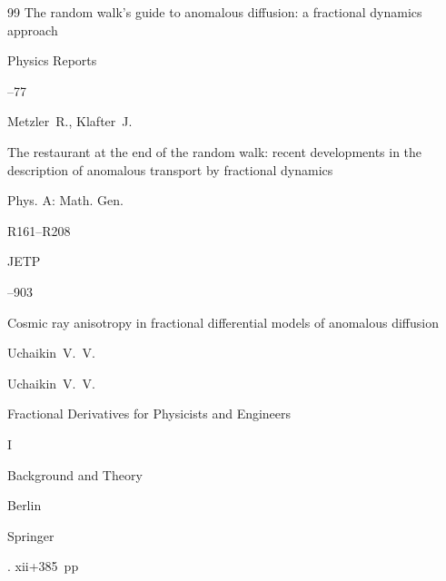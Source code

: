 \begin{thebibliography}{99}
\paper The random walk's guide to anomalous diffusion: a fractional dynamics  approach 

\jour Physics Reports




--77





\by Metzler~R., Klafter~J.

\paper The restaurant at the end of the random walk: recent developments in the description of anomalous transport by fractional dynamics

\jour Phys. A: Math. Gen.




\pages R161--R208









\jour JETP




--903

\paper Cosmic ray anisotropy in fractional differential models of anomalous diffusion

\by Uchaikin~V.~V.







\by Uchaikin~V.~V.

\book Fractional Derivatives for Physicists and Engineers

\vol I

\volinfo Background and Theory

\publaddr Berlin

\publ Springer

. xii+385~pp



\end{thebibliography}
